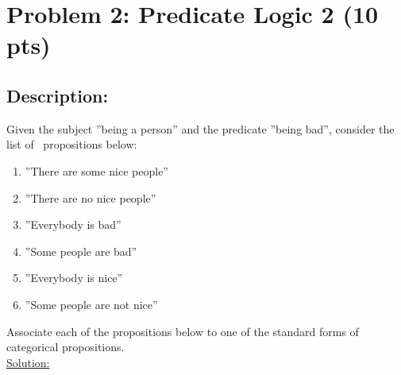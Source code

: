 \section{Problem 2: Predicate Logic 2 (10 pts)}

\subsection{Description:}

\noindent Given the subject {''being a person''} and the predicate {''being bad''}, consider the list of \ propositions below:
\begin{enumerate}
  \item {''There are some nice people''}
  \item {''There are no nice people''}
  \item {''Everybody is bad''}
  \item {''Some people are bad''}
  \item {''Everybody is nice''}
  \item {''Some people are not nice''}
  
\end{enumerate}

\noindent Associate each of the propositions below to one of the standard forms of categorical propositions.\\

\noindent \underline{Solution:}\\


